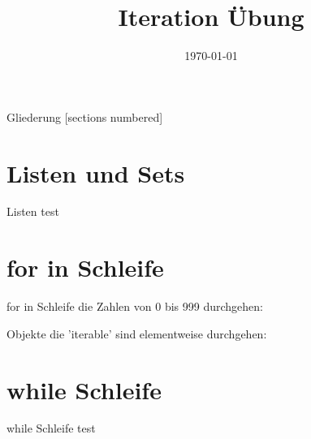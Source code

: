 



\title{Iteration Übung}
\date{\today}



	
\maketitle

\begin{frame}{Gliederung}
	[sections numbered]
	\tableofcontents
\end{frame}


\section{Listen und Sets}
\begin{frame}{Listen}
	test
\end{frame}

\section{for in Schleife}
\begin{frame}{for in Schleife}
	die Zahlen von 0 bis 999 durchgehen:
	
	Objekte die 'iterable' sind elementweise durchgehen:
	
	
\end{frame}

\section{while Schleife}
	\begin{frame}{while Schleife}
		test
	\end{frame}

